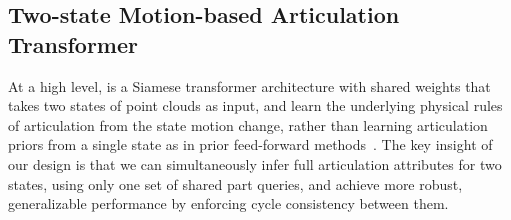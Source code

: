
\subsection{Two-state Motion-based Articulation Transformer}
\label{sec:backbone}

At a high level, \method is a Siamese transformer architecture with shared weights that takes two states of point clouds as input,
and learn the underlying physical rules of articulation from the state motion change,
rather than learning articulation priors from a single state as in prior feed-forward methods~\cite{li2025particulate,li2025urdfanything,wu2026urdfanything_plus}.
The key insight of our design is that we can simultaneously infer full articulation attributes for two states,
using only one set of shared part queries,
and achieve more robust, generalizable performance by enforcing cycle consistency between them.

